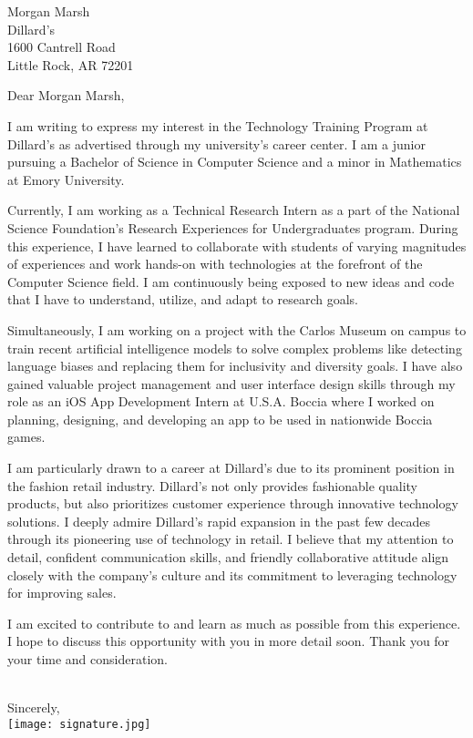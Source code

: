 \documentclass[letterpaper,12pt]{letter}
\date{}
\begin{document}
\begin{letter}{%
    Morgan Marsh \\ 
    Dillard's  \\ 
    1600 Cantrell Road \\
    Little Rock, AR 72201
}

\opening{Dear Morgan Marsh,}

I am writing to express my interest in the Technology Training Program at Dillard's
as advertised through my university's career center. I am a junior pursuing a Bachelor of Science 
in Computer Science and a minor in Mathematics at Emory University.

Currently, I am working as a Technical Research Intern as a part of the National Science Foundation's 
Research Experiences for Undergraduates program. During this experience, I have learned to 
collaborate with students of varying magnitudes of experiences and work hands-on with technologies at 
the forefront of the Computer Science field. I am continuously being exposed to new ideas 
and code that I have to understand, utilize, and adapt to research goals. 

Simultaneously, I am working on a project with the Carlos Museum on campus to train recent 
artificial intelligence models to solve complex problems like detecting language biases and 
replacing them for inclusivity and diversity goals. I have also gained valuable project management 
and user interface design skills through my role as an iOS App Development Intern at U.S.A. Boccia 
where I worked on planning, designing, and developing an app to be used in nationwide Boccia games. 

I am particularly drawn to a career at Dillard's due to its prominent position in the fashion retail industry. 
Dillard’s not only provides fashionable quality products, but also prioritizes customer experience through 
innovative technology solutions. I deeply admire Dillard's rapid expansion in the past few decades through its
pioneering use of technology in retail. I believe that my attention to detail, confident communication skills,
and friendly collaborative attitude align closely with the company’s culture and its commitment to leveraging
technology for improving sales.

I am excited to contribute to and learn as much as possible from this experience. I hope to discuss
this opportunity with you in more detail soon. Thank you for your time and consideration. \\\\

\closing{Sincerely, \\
\vspace{10pt}
\texttt{[image: signature.jpg]}}


\end{letter}

\end{document}
